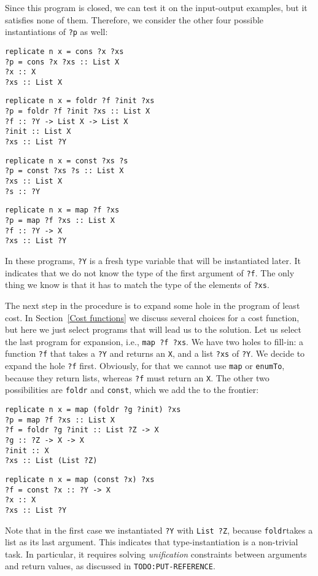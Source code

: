 Since this program is closed, we can test it on the input-output examples, but it satisfies none of them.  Therefore, we consider the other four possible instantiations of \lstinline!?p! as well:
\begin{lstlisting}[style=plain]
replicate n x = cons ?x ?xs
?p = cons ?x ?xs :: List X
?x :: X
?xs :: List X
\end{lstlisting}
\begin{lstlisting}[style=plain]
replicate n x = foldr ?f ?init ?xs
?p = foldr ?f ?init ?xs :: List X
?f :: ?Y -> List X -> List X
?init :: List X
?xs :: List ?Y
\end{lstlisting}
\begin{lstlisting}[style=plain]
replicate n x = const ?xs ?s
?p = const ?xs ?s :: List X
?xs :: List X
?s :: ?Y
\end{lstlisting}
\begin{lstlisting}[style=plain]
replicate n x = map ?f ?xs
?p = map ?f ?xs :: List X
?f :: ?Y -> X
?xs :: List ?Y
\end{lstlisting}
In these programs, \lstinline!?Y! is a fresh type variable that will be instantiated later.  It indicates that we do not know the type of the first argument of \lstinline!?f!. The only thing we know is that it has to match the type of the elements of \lstinline!?xs!.

The next step in the procedure is to expand some hole in the program of least cost.  In Section~\ref{Cost functions} we discuss several choices for a cost function, but here we just select programs that will lead us to the solution.  Let us select the last program for expansion, i.e., \lstinline|map ?f ?xs|.  We have two holes to fill-in: a function \lstinline!?f! that takes a \lstinline|?Y| and returns an \lstinline|X|, and a list \lstinline!?xs! of \lstinline|?Y|.  We decide to expand the hole \lstinline|?f| first.  Obviously, for that we cannot use \lstinline|map| or \lstinline|enumTo|, because they return lists, whereas \lstinline|?f| must return an \lstinline|X|.  The other two possibilities are \lstinline|foldr| and \lstinline|const|, which we add the to the frontier:

\begin{lstlisting}[style=plain]
replicate n x = map (foldr ?g ?init) ?xs
?p = map ?f ?xs :: List X
?f = foldr ?g ?init :: List ?Z -> X
?g :: ?Z -> X -> X
?init :: X
?xs :: List (List ?Z)
\end{lstlisting}

\begin{lstlisting}[style=plain]
replicate n x = map (const ?x) ?xs
?f = const ?x :: ?Y -> X
?x :: X
?xs :: List ?Y
\end{lstlisting}
Note that in the first case we instantiated \lstinline|?Y| with \lstinline|List ?Z|, because \lstinline|foldr|takes a list as its last argument.  This indicates that type-instantiation is a non-trivial task.  In particular, it requires solving \emph{unification} constraints between arguments and return values, as discussed in \verb|TODO:PUT-REFERENCE|.

